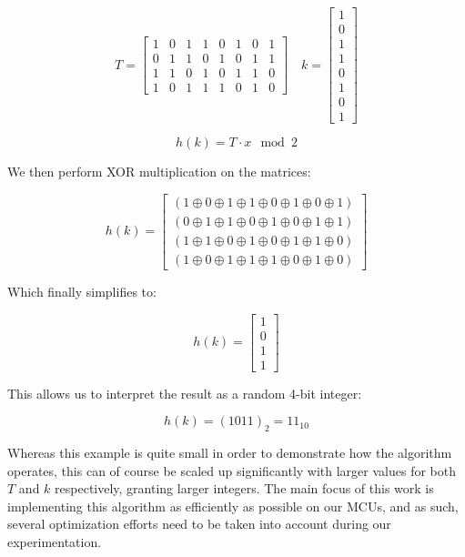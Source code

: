 \[
T =
\begin{bmatrix}
1 & 0 & 1 & 1 & 0 & 1 & 0 & 1 \\
0 & 1 & 1 & 0 & 1 & 0 & 1 & 1 \\
1 & 1 & 0 & 1 & 0 & 1 & 1 & 0 \\
1 & 0 & 1 & 1 & 1 & 0 & 1 & 0
\end{bmatrix}
\quad
k =
\begin{bmatrix}
1 \\ 0 \\ 1 \\ 1 \\ 0 \\ 1 \\ 0 \\ 1
\end{bmatrix}
\]

\[
h(k) = T \cdot x \mod 2
\]

\phantom{TEMP LINEBREAK}

We then perform XOR multiplication on the matrices:

\[
h(k) =
\begin{bmatrix}
(1 \oplus 0 \oplus 1 \oplus 1 \oplus 0 \oplus 1 \oplus 0 \oplus 1) \\
(0 \oplus 1 \oplus 1 \oplus 0 \oplus 1 \oplus 0 \oplus 1 \oplus 1) \\
(1 \oplus 1 \oplus 0 \oplus 1 \oplus 0 \oplus 1 \oplus 1 \oplus 0) \\
(1 \oplus 0 \oplus 1 \oplus 1 \oplus 1 \oplus 0 \oplus 1 \oplus 0)
\end{bmatrix}
\]

Which finally simplifies to:

\[
h(k) =
\begin{bmatrix}
1 \\
0 \\
1 \\
1
\end{bmatrix}
\]

This allows us to interpret the result as a random 4-bit integer:

\[
h(k) = (1011)_2 = 11_{10}
\]

Whereas this example is quite small in order to demonstrate how the algorithm operates, this can of course be scaled up significantly with larger values for both \(T\) and \(k\) respectively, granting larger integers. The main focus of this work is implementing this algorithm as efficiently as possible on our MCUs, and as such, several optimization efforts need to be taken into account during our experimentation.

